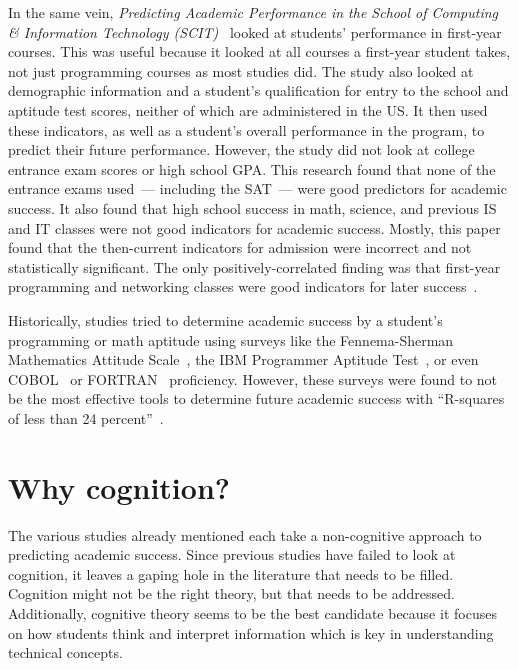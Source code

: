 In the same vein, \textit{Predicting Academic Performance in the School of Computing \& Information Technology (SCIT)}~\citep{golding2005} looked at students' performance in first-year courses. This was useful because it looked at all courses a first-year student takes, not just programming courses as most studies did. The study also looked at demographic information and a student's qualification for entry to the school and aptitude test scores, neither of which are administered in the US. It then used these indicators, as well as a student's overall performance in the program, to predict their future performance. However, the study did not look at college entrance exam scores or high school GPA. This research found that none of the entrance exams used~--- including the SAT~--- were good predictors for academic success. It also found that high school success in math, science, and previous IS and IT classes were not good indicators for academic success. Mostly, this paper found that the then-current indicators for admission were incorrect and not statistically significant. The only positively-correlated finding was that first-year programming and networking classes were good indicators for later success~\citep{golding2005}.

Historically, studies tried to determine academic success by a student's programming or math aptitude using surveys like the Fennema-Sherman Mathematics Attitude Scale~\citep{nowaczyk1984}, the IBM Programmer Aptitude Test~\citep{hostetler1983}, or even COBOL~\citep{nowaczyk1984} or FORTRAN~\citep{campbell1984} proficiency. However, these surveys were found to not be the most effective tools to determine future academic success with ``R-squares of less than 24 percent''~\citep{evans1989}.

\section{Why cognition?}
The various studies already mentioned each take a non-cognitive approach to predicting academic success. Since previous studies have failed to look at cognition, it leaves a gaping hole in the literature that needs to be filled. Cognition might not be the right theory, but that needs to be addressed. Additionally, cognitive theory seems to be the best candidate because it focuses on how students think and interpret information which is key in understanding technical concepts.

